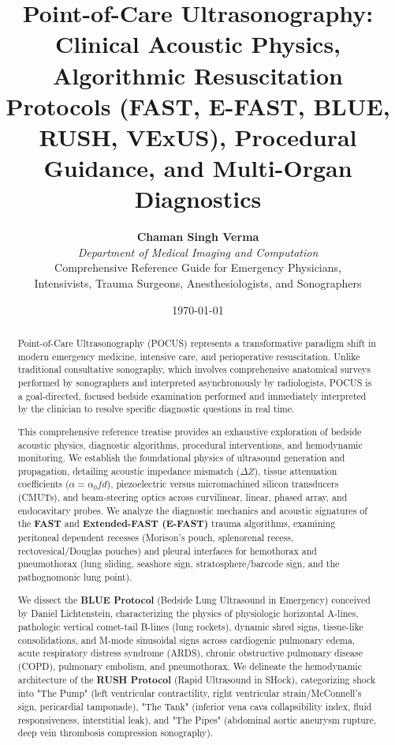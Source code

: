 \documentclass[11pt,a4paper]{article}
\title{\textbf{\huge Point-of-Care Ultrasonography:}\\[0.4em]
\Large Clinical Acoustic Physics, Algorithmic Resuscitation Protocols (FAST, E-FAST, BLUE, RUSH, VExUS), Procedural Guidance, and Multi-Organ Diagnostics}
\author{\textbf{Chaman Singh Verma} \\
\textit{Department of Medical Imaging and Computation} \\
\small \textsf{Comprehensive Reference Guide for Emergency Physicians,}\\[0.2em]
\small \textsf{Intensivists, Trauma Surgeons, Anesthesiologists, and Sonographers}}
\date{\today}
\begin{document}
\maketitle

\begin{abstract}
Point-of-Care Ultrasonography (POCUS) represents a transformative paradigm shift in modern emergency medicine, intensive care, and perioperative resuscitation. Unlike traditional consultative sonography, which involves comprehensive anatomical surveys performed by sonographers and interpreted asynchronously by radiologists, POCUS is a goal-directed, focused bedside examination performed and immediately interpreted by the clinician to resolve specific diagnostic questions in real time. 

This comprehensive reference treatise provides an exhaustive exploration of bedside acoustic physics, diagnostic algorithms, procedural interventions, and hemodynamic monitoring. We establish the foundational physics of ultrasound generation and propagation, detailing acoustic impedance mismatch ($\Delta Z$), tissue attenuation coefficients ($\alpha = \alpha_0 f d$), piezoelectric versus micromachined silicon transducers (CMUTs), and beam-steering optics across curvilinear, linear, phased array, and endocavitary probes. We analyze the diagnostic mechanics and acoustic signatures of the \textbf{FAST} and \textbf{Extended-FAST (E-FAST)} trauma algorithms, examining peritoneal dependent recesses (Morison's pouch, splenorenal recess, rectovesical/Douglas pouches) and pleural interfaces for hemothorax and pneumothorax (lung sliding, seashore sign, stratosphere/barcode sign, and the pathognomonic lung point). 

We dissect the \textbf{BLUE Protocol} (Bedside Lung Ultrasound in Emergency) conceived by Daniel Lichtenstein, characterizing the physics of physiologic horizontal A-lines, pathologic vertical comet-tail B-lines (lung rockets), dynamic shred signs, tissue-like consolidations, and M-mode sinusoidal signs across cardiogenic pulmonary edema, acute respiratory distress syndrome (ARDS), chronic obstructive pulmonary disease (COPD), pulmonary embolism, and pneumothorax. We delineate the hemodynamic architecture of the \textbf{RUSH Protocol} (Rapid Ultrasound in SHock), categorizing shock into "The Pump" (left ventricular contractility, right ventricular strain/McConnell's sign, pericardial tamponade), "The Tank" (inferior vena cava collapsibility index, fluid responsiveness, interstitial leak), and "The Pipes" (abdominal aortic aneurysm rupture, deep vein thrombosis compression sonography). 


\end{abstract}
\end{document}
